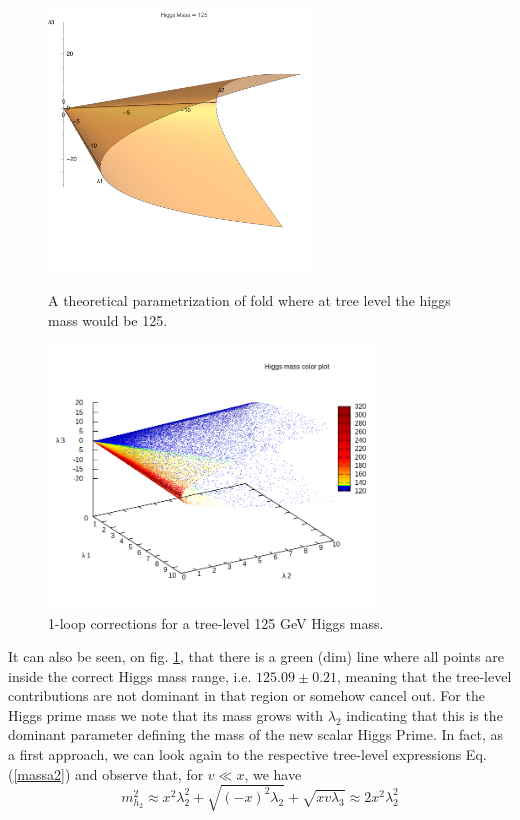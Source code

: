 \documentclass[12pt]{article}
\begin{document}
\begin{figure}[H]
  \centering
  \includegraphics[width=\linewidth,height=7cm,keepaspectratio]{invertido.pdf}
  \caption{A theoretical parametrization of fold where at tree level the higgs mass would be 125.}\label{fig:Teorico}
  \endminipage\hfill
  \includegraphics[width=\linewidth,height=7cm,keepaspectratio]{cone.png}
  \caption{1-loop corrections for a tree-level 125 GeV Higgs mass.}\label{fig:conic}
\endminipage\hfill
\end{figure}
%
It can also be seen, on fig. \ref{fig:conic}, that there is a green (dim) line where all points are inside the correct Higgs mass range, i.e. $125.09 \pm 0.21$, meaning that the tree-level contributions are not dominant in that region or somehow cancel out.
%
For the Higgs prime mass we note that its mass grows with $\lambda_2$ indicating that this is the dominant parameter defining the mass of the new scalar Higgs Prime.
%
In fact, as a first approach, we can look again to the respective tree-level expressions Eq. (\ref{massa2})  and observe that, for $v \ll x$, we have
%
\begin{equation}
m_{h_2}^2 \approx x^2 \lambda_2^2 + \sqrt{(-x)^2 \lambda_2} + \sqrt{x v \lambda_3} \approx  2 x^2 \lambda_2^2 
\end{equation}
\end{document}
